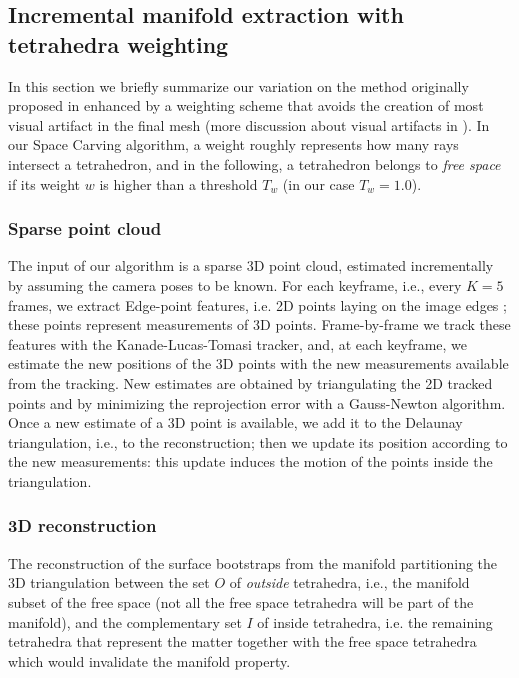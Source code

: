 \subsection{Incremental manifold extraction with tetrahedra weighting}
\label{subsec:incrementalManifold}

In this section we briefly summarize our variation on the method originally proposed in \cite{litvinov_lhuillier_13} enhanced by a weighting scheme that avoids the creation of most visual artifact in the final mesh (more discussion about visual artifacts in \cite{litvinov_Lhiuller14}).  
In our Space Carving algorithm, a weight roughly represents how many rays intersect a tetrahedron, and in the following, a tetrahedron belongs to \emph{free space} if its weight $w$ is higher than a threshold $T_w$ (in our case $T_w = 1.0$).

\subsubsection{Sparse point cloud}
The input of our algorithm is a sparse 3D point cloud, estimated incrementally by assuming the camera poses to be known.
For each keyframe, i.e., every $K=5$ frames, we extract Edge-point features, i.e. 2D points laying on the image edges \cite{Rhein_et_al13}; these points represent measurements of 3D points.
Frame-by-frame we track these features with the Kanade-Lucas-Tomasi tracker, and, at each keyframe, we estimate the new positions of the 3D points with the new  measurements available from the tracking. New estimates are obtained by triangulating the 2D tracked points and by minimizing the reprojection error with a Gauss-Newton algorithm. Once a new estimate of a 3D point is available, we add it to the Delaunay triangulation, i.e., to the reconstruction; then we update its position according to the new measurements: this update induces the motion of the points inside the triangulation.

\subsubsection{3D reconstruction}
The reconstruction of the surface bootstraps from the manifold partitioning the 3D triangulation between the set $O$ of \emph{outside} tetrahedra, i.e., the manifold subset of the free space (not all the free space tetrahedra will be part of the manifold), and the complementary set $I$ of inside tetrahedra, i.e. the remaining tetrahedra that represent the matter together with the free space tetrahedra which would invalidate the manifold property.

